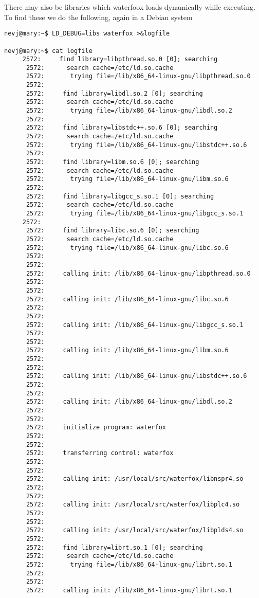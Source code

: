 \documentclass[a4paper]{article}  %
\begin{document}
 There may also be libraries which waterfoox loads dynamically while executing. To find these we do the following, again in a Debian system
\begin{tcolorbox}[breakable]
\begin{verbatim}
nevj@mary:~$ LD_DEBUG=libs waterfox >&logfile

nevj@mary:~$ cat logfile
     2572:     find library=libpthread.so.0 [0]; searching
      2572:      search cache=/etc/ld.so.cache
      2572:       trying file=/lib/x86_64-linux-gnu/libpthread.so.0
      2572:
      2572:     find library=libdl.so.2 [0]; searching
      2572:      search cache=/etc/ld.so.cache
      2572:       trying file=/lib/x86_64-linux-gnu/libdl.so.2
      2572:
      2572:     find library=libstdc++.so.6 [0]; searching
      2572:      search cache=/etc/ld.so.cache
      2572:       trying file=/lib/x86_64-linux-gnu/libstdc++.so.6
      2572:
      2572:     find library=libm.so.6 [0]; searching
      2572:      search cache=/etc/ld.so.cache
      2572:       trying file=/lib/x86_64-linux-gnu/libm.so.6
      2572:
      2572:     find library=libgcc_s.so.1 [0]; searching
      2572:      search cache=/etc/ld.so.cache
      2572:       trying file=/lib/x86_64-linux-gnu/libgcc_s.so.1
     2572:
      2572:     find library=libc.so.6 [0]; searching
      2572:      search cache=/etc/ld.so.cache
      2572:       trying file=/lib/x86_64-linux-gnu/libc.so.6
      2572:
      2572:
      2572:     calling init: /lib/x86_64-linux-gnu/libpthread.so.0
      2572:
      2572:
      2572:     calling init: /lib/x86_64-linux-gnu/libc.so.6
      2572:
      2572:
      2572:     calling init: /lib/x86_64-linux-gnu/libgcc_s.so.1
      2572:
      2572:
      2572:     calling init: /lib/x86_64-linux-gnu/libm.so.6
      2572:
      2572:
      2572:     calling init: /lib/x86_64-linux-gnu/libstdc++.so.6
      2572:
      2572:
      2572:     calling init: /lib/x86_64-linux-gnu/libdl.so.2
      2572:
      2572:
      2572:     initialize program: waterfox
      2572:
      2572:
      2572:     transferring control: waterfox
      2572:
      2572:
      2572:     calling init: /usr/local/src/waterfox/libnspr4.so
      2572:
      2572:
      2572:     calling init: /usr/local/src/waterfox/libplc4.so
      2572:
      2572:
      2572:     calling init: /usr/local/src/waterfox/libplds4.so
      2572:
      2572:     find library=librt.so.1 [0]; searching
      2572:      search cache=/etc/ld.so.cache
      2572:       trying file=/lib/x86_64-linux-gnu/librt.so.1
      2572:
      2572:
      2572:     calling init: /lib/x86_64-linux-gnu/librt.so.1

\end{verbatim}
\end{tcolorbox}
\end{document}
